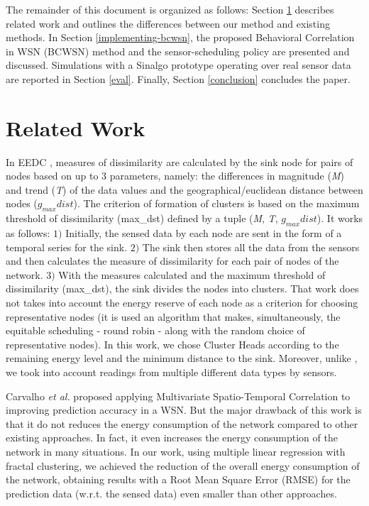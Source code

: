 \documentclass{acm_proc_article-sp}
\begin{document}
The remainder of this document is organized as follows: Section
\ref{related-work} describes related work and outlines the differences between
our method and existing methods. In Section \ref{implementing-bcwsn}, the
proposed Behavioral Correlation in WSN (BCWSN) method and the sensor-scheduling
policy are presented and discussed. Simulations with a Sinalgo
\cite{Sinalgo2007} prototype operating over real sensor data are reported in
Section \ref{eval}. Finally, Section \ref{conclusion} concludes the paper.


\section{Related Work}
\label{related-work}

In EEDC \cite{Liu2007}, measures of dissimilarity are calculated by the sink
node for pairs of nodes based on up to $3$ parameters, namely:
the differences in magnitude (\textit{M}) and trend (\textit{T}) of the data
values and the geographical/euclidean distance between nodes ($g_{max}dist$).
The criterion of formation of clusters is based on the maximum threshold of
dissimilarity (max\_dst) defined by a tuple (\textit{M}, \textit{T},
$g_{max}dist$). It works as follows: $1)$ Initially, the sensed data by each
node are sent in the form of a temporal series for the sink. $2)$ The sink then
stores all the data from the sensors and then calculates the measure of
dissimilarity for each pair of nodes of the network. $3)$
With the measures calculated and the maximum threshold of dissimilarity
(max\_dst), the sink divides the nodes into clusters.
That work does not takes into account the energy reserve of each node as a
criterion for choosing representative nodes (it is used an algorithm that makes,
simultaneously, the equitable scheduling - round robin - along with the random
choice of representative nodes). In this work, we chose Cluster Heads according
to the remaining energy level and the minimum distance to the sink. Moreover,
unlike \cite{Liu2007}, we took into account readings from multiple different
data types by sensors.
\vspace*{-.3cm}

Carvalho \textit{et al.} \cite{Carvalho2011} proposed applying Multivariate
Spatio-Temporal Correlation to improving prediction accuracy in a WSN. But the
major drawback of this work is that it do not reduces the energy consumption of
the network compared to other existing approaches. In fact, it even increases
the energy consumption of the network in many situations. In our work, using
multiple linear regression with fractal clustering, we achieved the reduction of
the overall energy consumption of the network, obtaining results with a Root
Mean Square Error (RMSE) for the prediction data (w.r.t. the sensed data) even
smaller than other approaches.
\vspace*{-.3cm}
\end{document}
